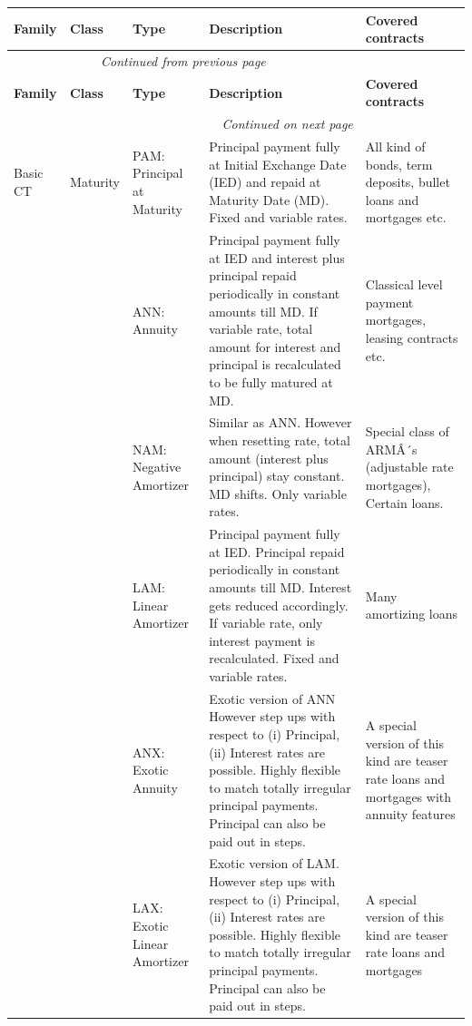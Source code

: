 \documentclass[9pt,oneside]{amsart}
\begin{document}
\begin{longtable}{| p{}p{}p{}p{}p{} |}
	\hline
	\textbf{Family} & \textbf{Class} & \textbf{Type} & \textbf{Description} & \textbf{Covered contracts} \\
	\hline
	\endfirsthead
	\multicolumn{4}{c}{\textit{Continued from previous page}} \\
	\hline
	\textbf{Family} & \textbf{Class} & \textbf{Type} & \textbf{Description} & \textbf{Covered contracts} \\
	\hline
	\endhead
	\hline \multicolumn{4}{r}{\textit{Continued on next page}} \\
	\endfoot
	\endlastfoot
	Basic CT & Maturity & PAM: Principal at Maturity & Principal payment fully at Initial Exchange Date (IED) and repaid at Maturity Date (MD). Fixed and variable rates. & All kind of bonds, term deposits, bullet loans and mortgages etc. \\
	\hline
	 & & ANN: Annuity & Principal payment fully at IED and interest plus principal repaid periodically in constant amounts till MD. If variable rate, total amount for interest and principal is recalculated to be fully matured at MD. & Classical level payment mortgages, leasing contracts etc. \\
	\hline 
	 & & NAM: Negative Amortizer & Similar as ANN. However when resetting rate, total amount (interest plus principal) stay constant. MD shifts. Only variable rates. & Special class of ARMÂ´s (adjustable rate mortgages), Certain loans. \\
	\hline 
	 & & LAM: Linear Amortizer & Principal payment fully at IED. Principal repaid periodically in constant amounts till MD. Interest gets reduced accordingly. If variable rate, only interest payment is recalculated. Fixed and variable rates. & Many amortizing loans \\
	\hline 
	 & & ANX: Exotic Annuity & Exotic version of ANN However step ups with respect to (i) Principal, (ii) Interest rates are possible. Highly flexible to match totally irregular principal payments. Principal can also be paid out in steps. & A special version of this kind are teaser rate loans and mortgages with annuity features \\
	\hline 
	 & & LAX: Exotic Linear Amortizer & Exotic version of LAM. However step ups with respect to (i) Principal, (ii) Interest rates are possible. Highly flexible to match totally irregular principal payments. Principal can also be paid out in steps. & A special version of this kind are teaser rate loans and mortgages \\

\end{longtable}
\end{document}
